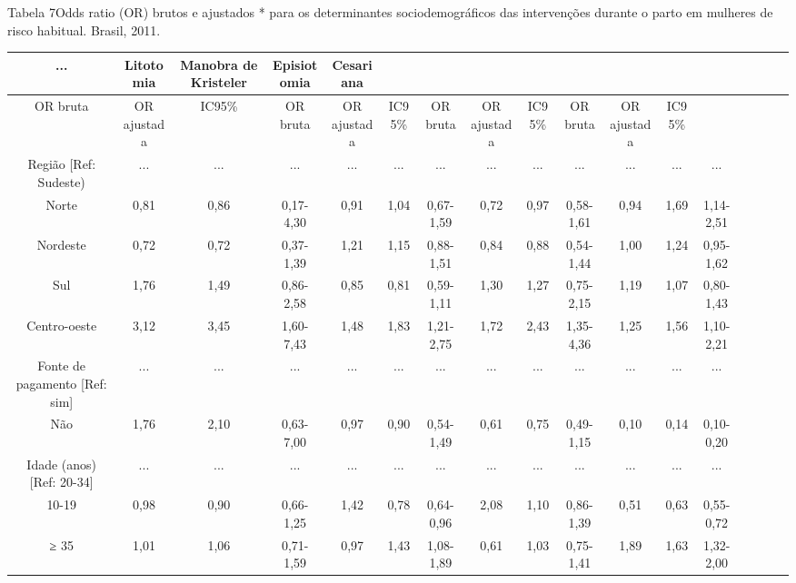 \documentclass{article}
\begin{document}
Tabela 7Odds ratio (OR) brutos e ajustados * para os determinantes
sociodemográficos das intervenções durante o parto em mulheres de risco
habitual. Brasil, 2011.\begin{table}
\small\centering
\begin{tabulary}{\linewidth}{ C C C C C C C C C C C C C C C C C }
\hline... & Litotomia & Manobra de Kristeler & Episiotomia & Cesariana\\ \hline
OR bruta & OR ajustada & IC95\% & OR bruta & OR ajustada & IC95\% & OR bruta &
OR ajustada & IC95\% & OR bruta & OR ajustada & IC95\%\\ \hline
Região [Ref: Sudeste)
& ...
& ...
& ...
& ...
& ...
& ...
& ...
& ...
& ...
& ...
& ...
& ...
\\ \hline

Norte
& 0,81
& 0,86
& 0,17-4,30
& 0,91
& 1,04
& 0,67-1,59
& 0,72
& 0,97
& 0,58-1,61
& 0,94
& 1,69
& 1,14-2,51
\\ \hline

Nordeste
& 0,72
& 0,72
& 0,37-1,39
& 1,21
& 1,15
& 0,88-1,51
& 0,84
& 0,88
& 0,54-1,44
& 1,00
& 1,24
& 0,95-1,62
\\ \hline

Sul
& 1,76
& 1,49
& 0,86-2,58
& 0,85
& 0,81
& 0,59-1,11
& 1,30
& 1,27
& 0,75-2,15
& 1,19
& 1,07
& 0,80-1,43
\\ \hline

Centro-oeste
& 3,12
& 3,45
& 1,60-7,43
& 1,48
& 1,83
& 1,21-2,75
& 1,72
& 2,43
& 1,35-4,36
& 1,25
& 1,56
& 1,10-2,21
\\ \hline

Fonte de pagamento [Ref: sim]
& ...
& ...
& ...
& ...
& ...
& ...
& ...
& ...
& ...
& ...
& ...
& ...
\\ \hline

Não
& 1,76
& 2,10
& 0,63-7,00
& 0,97
& 0,90
& 0,54-1,49
& 0,61
& 0,75
& 0,49-1,15
& 0,10
& 0,14
& 0,10-0,20
\\ \hline

Idade (anos) [Ref: 20-34]
& ...
& ...
& ...
& ...
& ...
& ...
& ...
& ...
& ...
& ...
& ...
& ...
\\ \hline

10-19
& 0,98
& 0,90
& 0,66-1,25
& 1,42
& 0,78
& 0,64-0,96
& 2,08
& 1,10
& 0,86-1,39
& 0,51
& 0,63
& 0,55-0,72
\\ \hline

≥ 35
& 1,01
& 1,06
& 0,71-1,59
& 0,97
& 1,43
& 1,08-1,89
& 0,61
& 1,03
& 0,75-1,41
& 1,89
& 1,63
& 1,32-2,00
\\ \hline


\end{tabulary}
\end{table}
\end{document}
